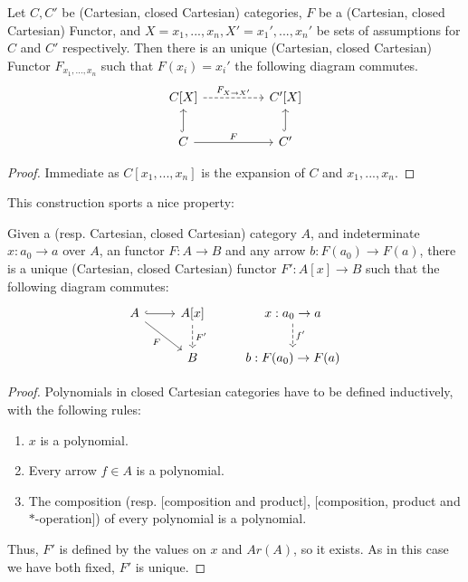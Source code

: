 \begin{proposition}\label{unique-polynomial-functor}Let $C,C'$ be (Cartesian, closed Cartesian) categories, $F$ be a (Cartesian, closed Cartesian) Functor, and $X={x_1,...,x_n}, X'={x_1',...,x_n'}$ be sets of assumptions for $C$ and $C'$ respectively. Then there is an unique (Cartesian, closed Cartesian) Functor $F_{x_1,...,x_n}$ such that $F(x_i)=x_i'$ the following diagram commutes. 
  \[
    \begin{tikzcd}
      C[X]\arrow[dashed]{rr}{F_{X\to X'}}&& C'[X]\\
      C \arrow{rr}{F}\arrow[hookrightarrow]{u}{}&& C'\arrow[hookrightarrow]{u}{}
    \end{tikzcd}
  \]
\end{proposition}
\begin{proof}
  Immediate as $C[x_1,...,x_n]$ is the expansion of $C$ and ${x_1,...,x_n}$.
\end{proof}

This construction sports a nice property:

\begin{proposition}\label{univ-polynomial}
  Given a (resp. Cartesian, closed Cartesian) category $A$, and indeterminate $x:a_0\to a$ over $A$, an functor $F:A\to B$ and any arrow $ b:F(a_0) \to F(a)$, there is a unique (Cartesian, closed Cartesian) functor $F': A[x]\to B$ such that the following diagram commutes:
  \[
    \begin{tikzcd}
      A\arrow[hookrightarrow]{r}{} \arrow[rd, "F", swap]      & A[x] \arrow[d, "F'", dashed]& x:a_0\to a\arrow[d,"f'",dashed]\\
      &B& b:F(a_0)\to F(a) 
    \end{tikzcd}
  \]
\end{proposition}
\begin{proof}
  Polynomials in closed Cartesian categories have to be defined inductively, with the following rules:
  \begin{enumerate}
  \item $x$ is a polynomial.
  \item Every arrow $f\in A$ is a polynomial.
  \item The composition (resp.  [composition and product],  [composition, product and $*$-operation]) of every polynomial is a polynomial.
  \end{enumerate}
  Thus, $F'$ is defined by the values on $x$ and $Ar(A)$, so it exists. As in this case we have both fixed, $F'$ is unique. 
\end{proof}


